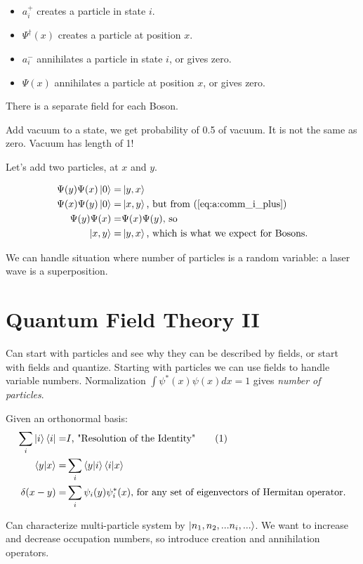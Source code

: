 \documentclass[]{article}
\newcommand\numberthis{\addtocounter{equation}{1}\tag{\theequation}}
\begin{document}
\begin{itemize}
	\item $a^+_i$ creates a particle in state $i$.
	\item $\Psi^\dagger(x)$  creates a particle at position $x$.
	\item $a^-_i$ annihilates a particle in state $i$, or gives zero.
	\item $\Psi(x)$  annihilates a particle at position $x$, or gives zero.
\end{itemize}

There is a separate field for each Boson.

Add vacuum to a state, we get probability of 0.5 of vacuum. It is not the same as zero. Vacuum has length of 1!

Let's add two particles, at $x$ and $y$. 
 
\begin{align*}
\Psi(y)\Psi(x)\ket{0} =& \ket{y,x}\\
\Psi(x)\Psi(y)\ket{0} =& \ket{x,y} \text{, but from (\ref {eq:a:comm_i_plus})}\\
\Psi(y)\Psi(x) =& \Psi(x)\Psi(y) \text{, so}\\
\ket{x,y} =& \ket{y,x} \text{, which is what we expect for Bosons.} 
\end{align*}

We can handle situation where number of particles is a random variable: a laser wave is a superposition.

\section{Quantum Field Theory II}

Can start with particles and see why they can be described by fields, or start with fields and quantize. Starting with particles we can use fields to handle variable numbers. Normalization $\int \psi^*(x) \psi(x) dx=1$ gives \textit{number of particles}.

Given an orthonormal basis:
\begin{align*}
\sum_{i} \ket{i} \bra{i} =& I \text{, "Resolution of the Identity"}\numberthis \label{eq:resolution:identity}\\
\braket{y|x}=& \sum_{i} \braket{y|i} \braket{i|x}\\
\delta(x-y)=& \sum_{i} \psi_i(y) \psi^*_i(x)\text{, for any set of eigenvectors of Hermitan operator.}
\end{align*}

Can characterize multi-particle system by $\ket{n_1, n_2,...n_i,...}$. We want to increase and decrease occupation numbers, so introduce creation and annihilation operators.
\end{document}
